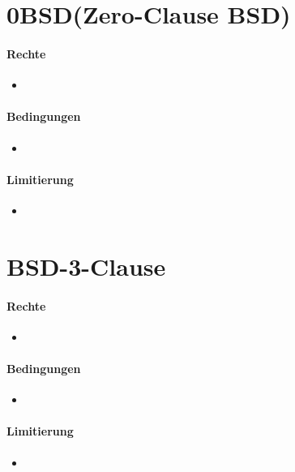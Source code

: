 \section{0BSD(Zero-Clause BSD)}


\paragraph{Rechte}
\begin{itemize}
    \item
\end{itemize}
\paragraph{Bedingungen}
\begin{itemize}
    \item
\end{itemize}

\paragraph{Limitierung}
\begin{itemize}
    \item
\end{itemize}

\section{BSD-3-Clause}


\paragraph{Rechte}
\begin{itemize}
    \item
\end{itemize}
\paragraph{Bedingungen}
\begin{itemize}
    \item
\end{itemize}

\paragraph{Limitierung}
\begin{itemize}
    \item
\end{itemize}

